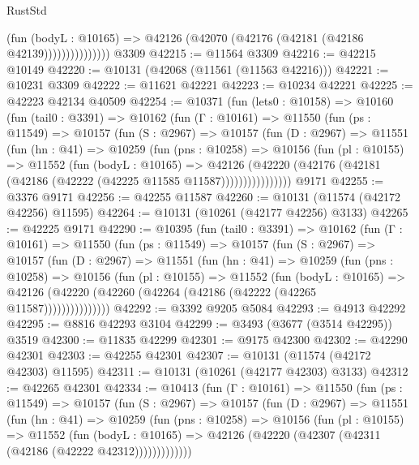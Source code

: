\begin{lexlean}{RustStd}
\begin{coremodule}
                        (fun (bodyL : @10165) =>
                        @42126 (@42070 (@42176 (@42181 (@42186 @42139)))))))))))))))
    @3309
@42215 := @11564 @3309
@42216 := @42215 @10149
@42220 := @10131 (@42068 (@11561 (@11563 @42216)))
@42221 := @10231 @3309
@42222 := @11621 @42221
@42223 := @10234 @42221
@42225 := @42223 @42134 @40509
@42254 := @10371
    (fun (lets0 : @10158) =>
    @10160
      (fun (tail0 : @3391) =>
      @10162
        (fun (Γ : @10161) =>
        @11550
          (fun (ps : @11549) =>
          @10157
            (fun (S : @2967) =>
            @10157
              (fun (D : @2967) =>
              @11551
                (fun (hn : @41) =>
                @10259
                  (fun (pns : @10258) =>
                  @10156
                    (fun (pl : @10155) =>
                    @11552
                      (fun (bodyL : @10165) =>
                      @42126
                        (@42220
                          (@42176 (@42181 (@42186 (@42222 (@42225 @11585 @11587))))))))))))))))
    @9171
@42255 := @3376 @9171
@42256 := @42255 @11587
@42260 := @10131 (@11574 (@42172 @42256) @11595)
@42264 := @10131 (@10261 (@42177 @42256) @3133)
@42265 := @42225 @9171
@42290 := @10395
    (fun (tail0 : @3391) =>
    @10162
      (fun (Γ : @10161) =>
      @11550
        (fun (ps : @11549) =>
        @10157
          (fun (S : @2967) =>
          @10157
            (fun (D : @2967) =>
            @11551
              (fun (hn : @41) =>
              @10259
                (fun (pns : @10258) =>
                @10156
                  (fun (pl : @10155) =>
                  @11552
                    (fun (bodyL : @10165) =>
                    @42126 (@42220 (@42260 (@42264 (@42186 (@42222 (@42265 @11587)))))))))))))))
@42292 := @3392 @9205 @5084
@42293 := @4913 @42292
@42295 := @8816 @42293 @3104
@42299 := @3493 (@3677 (@3514 @42295)) @3519
@42300 := @11835 @42299
@42301 := @9175 @42300
@42302 := @42290 @42301
@42303 := @42255 @42301
@42307 := @10131 (@11574 (@42172 @42303) @11595)
@42311 := @10131 (@10261 (@42177 @42303) @3133)
@42312 := @42265 @42301
@42334 := @10413
    (fun (Γ : @10161) =>
    @11550
      (fun (ps : @11549) =>
      @10157
        (fun (S : @2967) =>
        @10157
          (fun (D : @2967) =>
          @11551
            (fun (hn : @41) =>
            @10259
              (fun (pns : @10258) =>
              @10156
                (fun (pl : @10155) =>
                @11552
                  (fun (bodyL : @10165) =>
                  @42126 (@42220 (@42307 (@42311 (@42186 (@42222 @42312)))))))))))))

\end{coremodule}
\end{lexlean}
